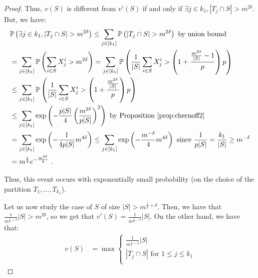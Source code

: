 \begin{proof}
    Thus, $v(S)$ is different from $v'(S)$ if and only if $\exists j \in k_1, |T_j \cap S| > m^{2\delta}$. But, we have:
    \begin{equation}
      \begin{aligned}
        &\mathbb{P}\left(\exists j \in k_1, |T_j \cap S| > m^{2\delta}\right) \leq \sum_{j \in [k_1]} \mathbb{P}\left(|T_j \cap S| > m^{2\delta}\right) \text{ by union bound}\\
        &=\sum_{j \in [k_1]} \mathbb{P}\left(\sum_{i \in S}X_j^i > m^{2\delta}\right)
        =\sum_{j \in [k_1]} \mathbb{P}\left(\frac{1}{|S|}\sum_{i \in S}X_j^i > \left(1 + \frac{\frac{m^{2\delta}}{[S|}-1}{p}\right)p \right)\\
        &\leq \sum_{j \in [k_1]} \mathbb{P}\left(\frac{1}{|S|}\sum_{i \in S}X_j^i > \left(1 + \frac{\frac{m^{2\delta}}{|S|}}{p}\right)p \right)\\
        &\leq \sum_{j \in [k_1]}\exp\left(-\frac{p|S|}{4}\left(\frac{m^{2\delta}}{p|S|}\right)^2\right) \text{ by Proposition~\ref{prop:chernoff2}}\\
        &= \sum_{j \in [k_1]}\exp\left(-\frac{1}{4p|S|}m^{4\delta}\right) \leq \sum_{j \in [k_1]}\exp\left(-\frac{m^{-\delta}}{4}m^{4\delta}\right) \text{ since } \frac{1}{p|S|} = \frac{k_1}{|S|} \geq m^{-\delta}\\
        &= m^{\frac{1}{2}}e^{-\frac{m^{3\delta}}{4}}\ .
      \end{aligned}
    \end{equation}

    Thus, this event occurs with exponentially small probability (on the choice of the partition $T_1,\ldots,T_{k_1}$).

    Let us now study the case of $S$ of size $|S| > m^{\frac{1}{2}+\delta}$. Then, we have that $\frac{1}{m^{\frac{1}{2}-\delta}}|S| > m^{2\delta}$, so we get that $v'(S) = \frac{1}{m^{\frac{1}{2}-\delta}}|S|$. On the other hand, we have that:   
    \begin{equation}
    \begin{aligned}
      v(S) &= \max\begin{cases}
      \frac{1}{m^{\frac{1}{2}-\delta}}|S|\\
      |T_j \cap S| \text{ for } 1 \leq j \leq k_1\\
      \end{cases}
    \end{aligned}
    \end{equation}
    

\end{proof}
